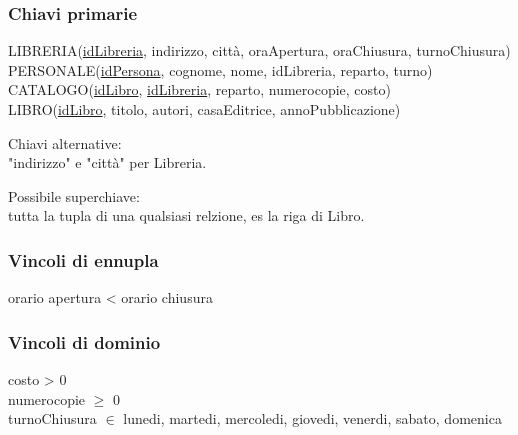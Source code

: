 \subsubsection{Chiavi primarie}
LIBRERIA(\underline{idLibreria}, indirizzo, città, oraApertura, oraChiusura, turnoChiusura)
\\PERSONALE(\underline{idPersona}, cognome, nome, idLibreria, reparto, turno)
\\CATALOGO(\underline{idLibro}, \underline{idLibreria}, reparto, numerocopie, costo)
\\LIBRO(\underline{idLibro}, titolo, autori, casaEditrice, annoPubblicazione)

Chiavi alternative:
\\"indirizzo" e "città" per Libreria.

Possibile superchiave:
\\tutta la tupla di una qualsiasi relzione, es la riga di Libro.

\subsubsection{Vincoli di ennupla}
orario apertura < orario chiusura

\subsubsection{Vincoli di dominio}
costo > 0
\\numerocopie $\geq$ 0
\\turnoChiusura $\in$ {lunedi, martedi, mercoledi, giovedi, venerdi, sabato, domenica}